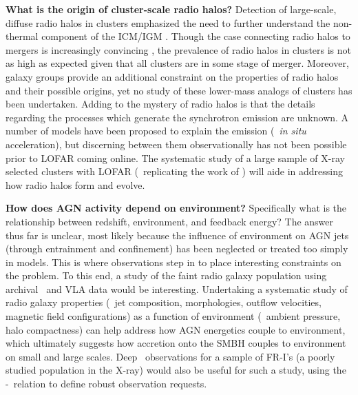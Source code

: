 \documentclass[12pt]{article}
\begin{document}
{\bf{What is the origin of cluster-scale radio halos?}} Detection of
large-scale, diffuse radio halos in clusters emphasized the need to
further understand the non-thermal component of the ICM/IGM
\cite[\eg][]{2009ApJ...704L..54G, 2009A&A...507.1257G}. Though the
case connecting radio halos to mergers is increasingly convincing
\cite{2009A&A...507..661B}, the prevalence of radio halos in clusters
is not as high as expected given that all clusters are in some stage
of merger. Moreover, galaxy groups provide an additional constraint on
the properties of radio halos and their possible origins, yet no study
of these lower-mass analogs of clusters has been undertaken. Adding to
the mystery of radio halos is that the details regarding the processes
which generate the synchrotron emission are unknown. A number of
models have been proposed to explain the emission (\eg\ {\textit{in
    situ}} acceleration), but discerning between them observationally
has not been possible prior to LOFAR coming online. The systematic
study of a large sample of X-ray selected clusters with LOFAR
(\eg\ replicating the work of \cite{2007A&A...463..937V,
  2008A&A...484..327V}) will aide in addressing how radio halos form
and evolve.

{\bf{How does AGN activity depend on environment?}} Specifically what
is the relationship between redshift, environment, and feedback
energy? The answer thus far is unclear, most likely because the
influence of environment on AGN jets (through entrainment and
confinement) has been neglected or treated too simply in models. This
is where observations step in to place interesting constraints on the
problem. To this end, a study of the faint radio galaxy population
using archival \chandra\ and VLA data would be
interesting. Undertaking a systematic study of radio galaxy properties
(\ie\ jet composition, morphologies, outflow velocities, magnetic
field configurations) as a function of environment (\ie\ ambient
pressure, halo compactness) can help address how AGN energetics couple
to environment, which ultimately suggests how accretion onto the SMBH
couples to environment on small and large scales. Deep
\chandra\ observations for a sample of FR-I's (a poorly studied
population in the X-ray) would also be useful for such a study, using
the \pjet-\prad\ relation to define robust observation requests.
\end{document}
